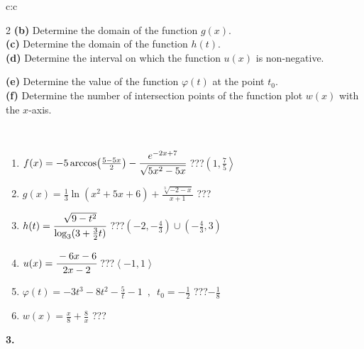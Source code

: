 \documentclass[10pt]{report}
\begin{document}
\begin{tabular}{c:c}
\begin{minipage}[c][104.5mm][t]{0.5\linewidth}
\begin{center}
\begin{minipage}{0.95\linewidth}
\begin{center}
{\begin{multicols}{2}
\textbf{(b)} Determine the domain of the function \(g(x)\). \\[1mm]
\textbf{(c)} Determine the domain of the function \(h(t)\). \\[1mm]
\textbf{(d)} Determine the interval on which the function \(u(x)\) is non-negative. \par \columnbreak
\textbf{(e)} Determine the value of the function \(\varphi(t)\) at the point \(t_0\). \\[1mm]
\textbf{(f)} Determine the number of intersection points of the function plot \(w(x)\) with the \(x\)-axis. \\[1mm]
\end{multicols}
}
\end{center}
\end{minipage}
\\[4mm]
\begin{minipage}{0.79\linewidth}
\begin{center}
\begin{varwidth}{\linewidth}
\begin{enumerate}
\small
\item $f(x) = -5\arccos\!\left( \frac{5-5x}{2} \right) - \cfrac{e^{-2x+7}}{\sqrt{5x^2-5x}}$\quad \dotfill\; ???\;\dotfill \quad $\left(1 , \frac{7}{5}\right\rangle$
\item $g(x) = \frac{1}{3} \ln{\!(x^2+5x+6)}+\frac{\sqrt[3]{-2-x}}{x+1}$\quad \dotfill\; ???\;\dotfill {}
\item $h(t) = \cfrac{\sqrt{9-t^2}}{\log_3(3+\frac{3}{2}t)}$\quad \dotfill\; ???\;\dotfill \quad $\left(-2 , -\frac{4}{3}\right)\cup\left(-\frac{4}{3} , 3\right)$
\item $u(x) = \cfrac{-6x-6}{2x-2}$\quad \dotfill\; ???\;\dotfill \quad $\left\langle-1 , 1\right\rangle$
\item $\varphi(t) = -3t^3-8t^2-\frac{5}{t}-1 \enspace , \enspace t_0=-\frac{1}{2}$\quad \dotfill\; ???\;\dotfill \quad $-\frac{1}{8}$
\item $w(x) = \frac{x}{8}+\frac{8}{x}$\quad \dotfill\; ???\;\dotfill {}
\end{enumerate}
\end{varwidth}
\end{center}
\end{minipage}
\begin{minipage}{0.20\linewidth}
\begin{center}
{\Huge\bfseries 3.} \\[2mm]

\end{center}
\end{minipage}
\end{center}
\end{minipage}
\end{tabular}
\end{document}
